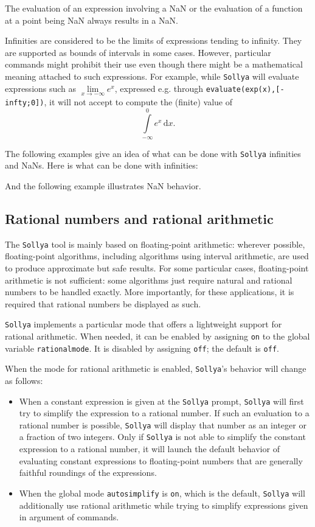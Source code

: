 \documentclass[a4paper]{article}
\newcommand{\com}[1]{\texttt{#1}}
\newcommand{\sollya}{\texttt{Sollya}\xspace}
\begin{document}
The evaluation of an expression involving a NaN or the evaluation of a
function at a point being NaN always results in a NaN. 

Infinities are considered to be the limits of expressions tending to
infinity. They are supported as bounds of intervals in some
cases. However, particular commands might prohibit their use even
though there might be a mathematical meaning attached to such
expressions. For example, while \sollya will evaluate expressions such
as $\lim\limits_{x \rightarrow -\infty} e^x$, expressed e.g. through
\texttt{evaluate(exp(x),[-infty;0])}, it will not accept to compute
the (finite) value of
$$\int\limits_{-\infty}^0 e^x \,\mbox{d}x.$$

The following examples give an idea of what can be done with \sollya
infinities and NaNs. Here is what can be done with infinities:

And the following example illustrates NaN behavior.


\subsection{Rational numbers and rational arithmetic}\label{sec:rationalmode}

The \sollya tool is mainly based on floating-point arithmetic:
wherever possible, floating-point algorithms, including algorithms
using interval arithmetic, are used to produce approximate but safe
results. For some particular cases, floating-point arithmetic is not
sufficient: some algorithms just require natural and rational numbers
to be handled exactly. More importantly, for these applications, it is
required that rational numbers be displayed as such.

\sollya implements a particular mode that offers a lightweight support
for rational arithmetic. When needed, it can be enabled by assigning
\com{on} to the global variable \com{rationalmode}. It is disabled by
assigning \com{off}; the default is \com{off}.

When the mode for rational arithmetic is enabled, \sollya's behavior
will change as follows:
\begin{itemize}
\item When a constant expression is given at the \sollya prompt,
  \sollya will first try to simplify the expression to a rational
  number. If such an evaluation to a rational number is possible,
  \sollya will display that number as an integer or a fraction of two
  integers. Only if \sollya is not able to simplify the constant
  expression to a rational number, it will launch the default behavior
  of evaluating constant expressions to floating-point numbers that
  are generally faithful roundings of the expressions.
\item When the global mode \com{autosimplify} is \com{on}, which is
  the default, \sollya will additionally use rational arithmetic while
  trying to simplify expressions given in argument of commands. 
\end{itemize}
\end{document}
